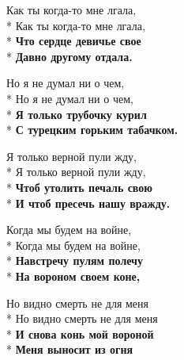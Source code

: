 \medskip

\begin{minipage}{\linewidth}
Как ты когда-то мне лгала,\\*
Как ты когда-то мне лгала,\\*
\textbf{Что сердце девичье свое}\\*
\textbf{Давно другому отдала.}\\
\end{minipage}\par\medskip\nobreak

\medskip

\begin{minipage}{\linewidth}
Но я не думал ни о чем,\\*
Но я не думал ни о чем,\\*
\textbf{Я только трубочку курил}\\*
\textbf{С турецким горьким табачком.}\\
\end{minipage}\par\medskip\nobreak

\medskip

\begin{minipage}{\linewidth}
Я только верной пули жду,\\*
Я только верной пули жду,\\*
\textbf{Чтоб утолить печаль свою}\\*
\textbf{И чтоб пресечь нашу вражду.}\\
\end{minipage}\par\medskip\nobreak

\medskip

\begin{minipage}{\linewidth}
Когда мы будем на войне,\\*
Когда мы будем на войне,\\*
\textbf{Навстречу пулям полечу}\\*
\textbf{На вороном своем коне,}\\
\end{minipage}\par\medskip\nobreak

\medskip

\begin{minipage}{\linewidth}
Но видно смерть не для меня\\*
Но видно смерть не для меня\\*
\textbf{И снова конь мой вороной}\\*
\textbf{Меня выносит из огня}\\
\end{minipage}

